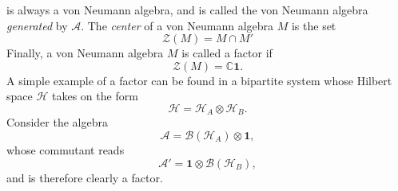 \documentclass[aps,pra,reprint,superscriptaddress]{revtex4-2}
\newcommand{\cA}{{\mathcal A}}
\newcommand{\cB}{{\mathcal B}}
\newcommand{\cH}{{\mathcal H}}
\newcommand{\cZ}{{\mathcal Z}}
\newcommand{\id}{\mathbf 1}
\theoremstyle{definition}
\theoremstyle{remark}
\begin{document}
    is always a von Neumann algebra, and is called the von Neumann algebra \emph{generated} by $ \cA$.
    The \emph{center} of a von Neumann algebra $M$ is the set
    \begin{equation}
        \cZ(M) = M \cap M' 
    \end{equation}
    Finally, a von Neumann algebra $M$ is called a factor if 
    \begin{equation}
        \cZ(M) = \mathbb{C} \id.
    \end{equation}
    A simple example of a factor can be found in a bipartite system whose Hilbert space $ \cH$ takes on the form
    \begin{equation}
        \cH = \cH_A \otimes \cH_B.
    \end{equation}
    Consider the algebra
    \begin{equation}
        \cA = \cB(\cH_A) \otimes \id,
    \end{equation}
    whose commutant reads
    \begin{equation}
        \cA' = \id \otimes \cB(\cH_B),
    \end{equation}
    and is therefore clearly a factor.
\end{document}
